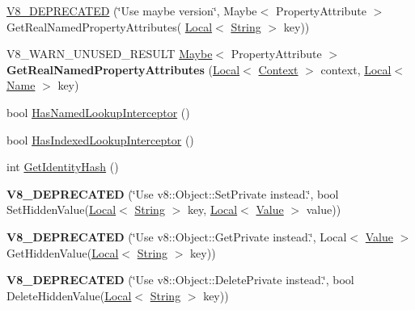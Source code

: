 \begin{DoxyCompactItemize}
\item 
\hyperlink{classv8_1_1Object_a9e3a8392408b53d887ea747151e1a823}{V8\+\_\+\+D\+E\+P\+R\+E\+C\+A\+T\+ED} (\char`\"{}Use maybe version\char`\"{}, Maybe$<$ Property\+Attribute $>$ Get\+Real\+Named\+Property\+Attributes(                                                                       \hyperlink{classv8_1_1Local}{Local}$<$ \hyperlink{classv8_1_1String}{String} $>$ key))
\item 
V8\+\_\+\+W\+A\+R\+N\+\_\+\+U\+N\+U\+S\+E\+D\+\_\+\+R\+E\+S\+U\+LT \hyperlink{classv8_1_1Maybe}{Maybe}$<$ Property\+Attribute $>$ {\bfseries Get\+Real\+Named\+Property\+Attributes} (\hyperlink{classv8_1_1Local}{Local}$<$ \hyperlink{classv8_1_1Context}{Context} $>$ context, \hyperlink{classv8_1_1Local}{Local}$<$ \hyperlink{classv8_1_1Name}{Name} $>$ key)\hypertarget{classv8_1_1Object_a476c21f05ffc519252fad0ab46de33d7}{}\label{classv8_1_1Object_a476c21f05ffc519252fad0ab46de33d7}

\item 
bool \hyperlink{classv8_1_1Object_a1e96fcb9ee17101c0299ec68f2cf8610}{Has\+Named\+Lookup\+Interceptor} ()
\item 
bool \hyperlink{classv8_1_1Object_a278913bcd203434870ce5184a538a9af}{Has\+Indexed\+Lookup\+Interceptor} ()
\item 
int \hyperlink{classv8_1_1Object_ac1ece41e81a499920ec3a2a3471653bc}{Get\+Identity\+Hash} ()
\item 
{\bfseries V8\+\_\+\+D\+E\+P\+R\+E\+C\+A\+T\+ED} (\char`\"{}Use v8\+::\+Object\+::\+Set\+Private instead.\char`\"{}, bool Set\+Hidden\+Value(\hyperlink{classv8_1_1Local}{Local}$<$ \hyperlink{classv8_1_1String}{String} $>$ key, \hyperlink{classv8_1_1Local}{Local}$<$ \hyperlink{classv8_1_1Value}{Value} $>$ value))\hypertarget{classv8_1_1Object_afb7135780f033b122025df8c6274a274}{}\label{classv8_1_1Object_afb7135780f033b122025df8c6274a274}

\item 
{\bfseries V8\+\_\+\+D\+E\+P\+R\+E\+C\+A\+T\+ED} (\char`\"{}Use v8\+::\+Object\+::\+Get\+Private instead.\char`\"{}, Local$<$ \hyperlink{classv8_1_1Value}{Value} $>$ Get\+Hidden\+Value(\hyperlink{classv8_1_1Local}{Local}$<$ \hyperlink{classv8_1_1String}{String} $>$ key))\hypertarget{classv8_1_1Object_acdece4ecbf0f68e0ba67582db5feae0d}{}\label{classv8_1_1Object_acdece4ecbf0f68e0ba67582db5feae0d}

\item 
{\bfseries V8\+\_\+\+D\+E\+P\+R\+E\+C\+A\+T\+ED} (\char`\"{}Use v8\+::\+Object\+::\+Delete\+Private instead.\char`\"{}, bool Delete\+Hidden\+Value(\hyperlink{classv8_1_1Local}{Local}$<$ \hyperlink{classv8_1_1String}{String} $>$ key))\hypertarget{classv8_1_1Object_a9390e502d8dbabbb18cbe2c47bc3c3b9}{}\label{classv8_1_1Object_a9390e502d8dbabbb18cbe2c47bc3c3b9}


\end{DoxyCompactItemize}
